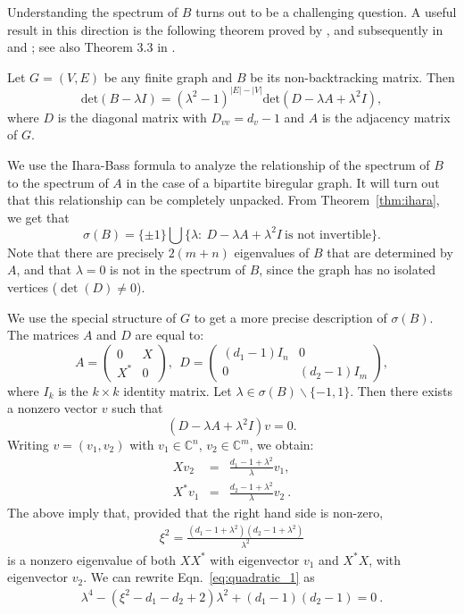Understanding the spectrum of $B$ turns out to be a challenging question. 
A useful result in this direction 
is the following theorem proved by \citet*{bass1992}, and subsequently in \citet*{watanabe2009} and \citet*{kotani2000};
see also Theorem 3.3 in \citet*{angel2015}.
\begin{theorem}\label{thm:ihara}
Let $G=(V,E)$ be any finite graph and $B$ be its non-backtracking matrix. 
Then
\[
\mathrm{det}(B-\lambda I) = (\lambda^2-1)^{|E|-|V|} 
  \mathrm{det}(D-\lambda A+\lambda^2 I),
\]
where $D$ is the diagonal matrix with $D_{vv}=d_v - 1$ 
and $A$ is the adjacency matrix of $G$. 
\end{theorem}
We use the Ihara-Bass formula to analyze the relationship of the spectrum of $B$ to the spectrum of $A$ in the case of a bipartite biregular graph.
It will turn out that this relationship can be completely unpacked. 
From Theorem~\ref{thm:ihara}, we get that
\[
\sigma(B)=\{\pm 1\}\bigcup\{\lambda:~ D-\lambda A+\lambda^2 I~\textrm{is not invertible}\}.
\]
Note that there are precisely $2(m+n)$ eigenvalues of $B$ that are determined by $A$, and that $\lambda = 0$ is not in the spectrum of $B$, since the graph has no isolated vertices ($\det(D) \neq 0$).

We use the special structure of $G$ to get a more precise description of $\sigma(B)$. 
The matrices $A$ and $D$ are equal to:
\[
A=\left(\begin{array}{cc} 0 & X \\
X^* & 0 \end{array}\right ),\ \
D=\left(\begin{array}{cc} (d_1-1)I_n & 0 \\
0 & (d_2-1)I_m \end{array}\right ),
\]
where $I_k$ is the $k\times k$ identity matrix.
Let $\lambda\in \sigma(B)\backslash\{-1,1\}$. 
Then there exists a nonzero vector $v$ such that
\[
(D-\lambda A+\lambda^2 I)v = 0 .
\]
Writing $v=(v_1,v_2)$ with $v_1\in \mathbb{C}^n$, $v_2\in \mathbb{C}^m$, we obtain:
\begin{eqnarray} 
\label{eq:sv_1}
Xv_2 & =& \frac{d_1-1+\lambda^2}{\lambda}v_1, \\
\label{eq:sv_2} 
X^*v_1 & = &\frac{d_2-1+\lambda^2}{\lambda}v_2~.
\end{eqnarray}    
The above imply that, provided that the right hand side is non-zero, 
\begin{eqnarray} 
\label{eq:quadratic_1}
\xi^2=\frac{(d_1-1+\lambda^2)(d_2-1+\lambda^2)}{\lambda^2}
\end{eqnarray}
is a nonzero eigenvalue of both $XX^*$ with eigenvector $v_1$ and $X^*X$, with eigenvector $v_2$.
We can rewrite Eqn.~\eqref{eq:quadratic_1} as
\begin{eqnarray} 
\label{eq:quadratic_2}
\lambda^4 - (\xi^2 - d_1 - d_2+2) \lambda^2 + (d_1-1)(d_2-1) = 0~.
\end{eqnarray}

